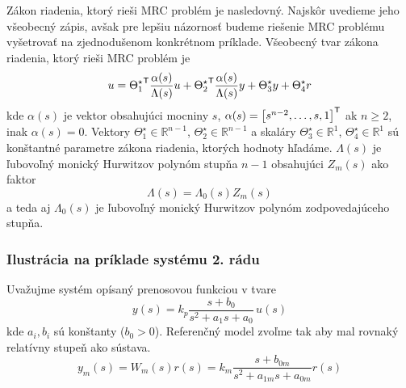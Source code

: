 \documentclass[a4paper, 10pt, ]{article}
\begin{document}
Zákon riadenia, ktorý rieši MRC problém je nasledovný. Najskôr uvedieme jeho všeobecný zápis, avšak pre lepšiu názornosť budeme riešenie MRC problému vyšetrovať na zjednodušenom konkrétnom príklade. Všeobecný tvar zákona riadenia, ktorý rieši MRC problém je
\begin{equation} \label{generalControlLaw}
    u = {\Theta_1^\star}^{\mathsf{T}} \frac{\alpha(s)}{\Lambda(s)} u + {\Theta_2^\star}^{\mathsf{T}} \frac{\alpha(s)}{\Lambda(s)} y + \Theta_3^\star y + \Theta_4^\star r
\end{equation}
kde $\alpha(s)$ je vektor obsahujúci mocniny $s$, $\alpha(s) = \begin{bmatrix} s^{n-2}, \ldots,s, 1 \end{bmatrix}^{\mathsf{T}}$ ak $n\geq 2$, inak $\alpha(s) = 0$. Vektory $\Theta_1^\star \in \mathbb{R}^{n-1}$, $\Theta_2^\star \in \mathbb{R}^{n-1}$ a skaláry $\Theta_3^\star \in \mathbb{R}^1$, $\Theta_4^\star \in \mathbb{R}^1$ sú konštantné parametre zákona riadenia, ktorých hodnoty hľadáme.  $\Lambda(s)$ je ľubovoľný monický Hurwitzov polynóm stupňa $n-1$ obsahujúci $Z_m(s)$ ako faktor
\begin{equation}
	\Lambda(s) = \Lambda_0(s) Z_m(s)
\end{equation}
a teda aj $\Lambda_0(s)$ je ľubovoľný monický Hurwitzov polynóm zodpovedajúceho stupňa.

















\subsubsection{Ilustrácia na príklade systému 2. rádu}
\label{MRCproblemPriklad}



Uvažujme systém opísaný prenosovou funkciou v tvare
\begin{equation} \label{genaralFormOfPlant04}
	y(s) = k_p \frac{s + b_0}{ s^2 + a_1 s + a_0} \, u(s)
\end{equation}
kde $a_i, b_i$ sú konštanty ($b_0 > 0$). Referenčný model zvoľme tak aby mal rovnaký relatívny stupeň ako sústava.
\begin{equation}
	y_m(s) = W_m(s)r(s) = k_m \frac{s + b_{0m}}{ s^2 + a_{1m} s + a_{0m}} r(s)
\end{equation}
\end{document}
